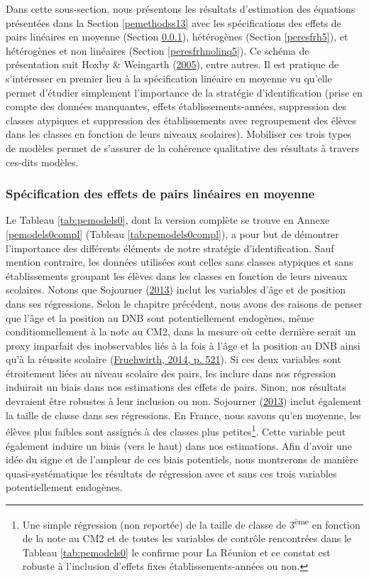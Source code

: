\documentclass[
]{book}
\begin{document}
Dans cette sous-section, nous présentons les résultats d'estimation des équations présentées dans la Section \ref{pemethodss13} avec les spécifications des effets de pairs linéaires en moyenne (Section \ref{peresfrlem}), hétérogènes (Section \ref{peresfrh5}), et hétérogènes et non linéaires (Section \ref{peresfrhnolinq5}). Ce schéma de présentation suit Hoxby \& Weingarth (\protect\hyperlink{ref-HOX:WEI:05}{2005}), entre autres. Il est pratique de s'intéresser en premier lieu à la spécification linéaire en moyenne vu qu'elle permet d'étudier simplement l'importance de la stratégie d'identification (prise en compte des données manquantes, effets établissements-années, suppression des classes atypiques et suppression des établissements avec regroupement des élèves dans les classes en fonction de leurs niveaux scolaires). Mobiliser ces trois types de modèles permet de s'assurer de la cohérence qualitative des résultats à travers ces-dits modèles.

\hypertarget{peresfrlem}{%
\subsubsection{Spécification des effets de pairs linéaires en moyenne}\label{peresfrlem}}

Le Tableau \ref{tab:pemodels0}, dont la version complète se trouve en Annexe \ref{pemodels0compl} (Tableau \ref{tab:pemodels0compl}), a pour but de démontrer l'importance des différents éléments de notre stratégie d'identification. Sauf mention contraire, les données utilisées sont celles sans classes atypiques et sans établissements groupant les élèves dans les classes en fonction de leurs niveaux scolaires.
Notons que Sojourner (\protect\hyperlink{ref-SOJ:13}{2013}) inclut les variables d'âge et de position dans ses régressions. Selon le chapitre précédent, nous avons des raisons de penser que l'âge et la position au DNB sont potentiellement endogènes, même conditionnellement à la note au CM2, dans la mesure où cette dernière serait un proxy imparfait des inobservables liés à la fois à l'âge et la position au DNB ainsi qu'à la réussite scolaire (\protect\hyperlink{ref-FRU:14}{Fruehwirth, 2014, p. 521}). Si ces deux variables sont étroitement liées au niveau scolaire des pairs, les inclure dans nos régression induirait un biais dans nos estimations des effets de pairs. Sinon, nos résultats devraient être robustes à leur inclusion ou non. Sojourner (\protect\hyperlink{ref-SOJ:13}{2013}) inclut également la taille de classe dans ses régressions. En France, nous savons qu'en moyenne, les élèves plus faibles sont assignés à des classes plus petites\footnote{Une simple régression (non reportée) de la taille de classe de 3\textsuperscript{ème} en fonction de la note au CM2 et de toutes les variables de contrôle rencontrées dans le Tableau \ref{tab:pemodels0} le confirme pour La Réunion et ce constat est robuste à l'inclusion d'effets fixes établissements-années ou non.}. Cette variable peut également induire un biais (vers le haut) dans nos estimations. Afin d'avoir une idée du signe et de l'ampleur de ces biais potentiels, nous montrerons de manière quasi-systématique les résultats de régression avec et sans ces trois variables potentiellement endogènes.
\end{document}
